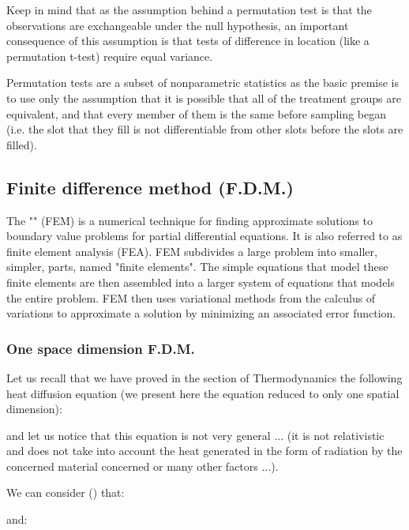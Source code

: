 	Keep in mind that as the assumption behind a permutation test is that the observations are exchangeable under the null hypothesis, an important consequence of this assumption is that tests of difference in location (like a permutation t-test) require equal variance. 
	\begin{tcolorbox}[title=Remark,colframe=black,arc=10pt]
	Permutation tests are a subset of nonparametric statistics as the basic premise is to use only the assumption that it is possible that all of the treatment groups are equivalent, and that every member of them is the same before sampling began (i.e. the slot that they fill is not differentiable from other slots before the slots are filled).
	\end{tcolorbox}
	
	\pagebreak
	\subsection{Finite difference method (F.D.M.)}
	The "" (FEM) is a numerical technique for finding approximate solutions to boundary value problems for partial differential equations. It is also referred to as finite element analysis (FEA). FEM subdivides a large problem into smaller, simpler, parts, named "finite elements". The simple equations that model these finite elements are then assembled into a larger system of equations that models the entire problem. FEM then uses variational methods from the calculus of variations to approximate a solution by minimizing an associated error function.
	
	\subsubsection{One space dimension F.D.M.}\label{one space dimension fdm}
	Let us recall that we have proved in the section of Thermodynamics the following heat diffusion equation (we present here the equation reduced to only one spatial dimension):
	
	and let us notice that this equation is not very general ... (it is not relativistic and does not take into account the heat generated in the form of radiation by the concerned material concerned or many other factors ...).

	We can consider () that:
	
	and:
	

